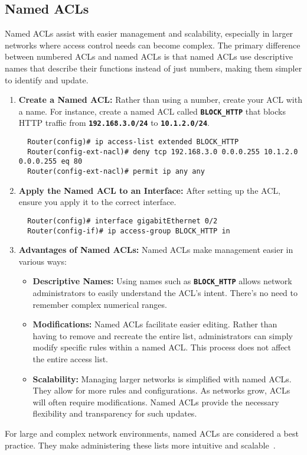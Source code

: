 \documentclass[11pt,a4paper]{article}
\begin{document}
    \subsection*{Named ACLs}
    Named ACLs assist with easier management and scalability, especially in larger networks where access control needs can become complex. The primary difference between numbered ACLs and named ACLs is that named ACLs use descriptive names that describe their functions instead of just numbers, making them simpler to identify and update.
        \begin{enumerate}
            \item \textbf{Create a Named ACL:} Rather than using a number, create your ACL with a name. For instance, create a named ACL called \textbf{\lstinline{BLOCK_HTTP}} that blocks HTTP traffic from \textbf{\lstinline{192.168.3.0/24}} to \textbf{\lstinline{10.1.2.0/24}}.
\begin{lstlisting}
  Router(config)# ip access-list extended BLOCK_HTTP
  Router(config-ext-nacl)# deny tcp 192.168.3.0 0.0.0.255 10.1.2.0 0.0.0.255 eq 80
  Router(config-ext-nacl)# permit ip any any
\end{lstlisting}
            \item \textbf{Apply the Named ACL to an Interface:} After setting up the ACL, ensure you apply it to the correct interface.
\begin{lstlisting}
  Router(config)# interface gigabitEthernet 0/2
  Router(config-if)# ip access-group BLOCK_HTTP in                
\end{lstlisting}
            
            \item \textbf{Advantages of Named ACLs:} Named ACLs make management easier in various ways:
                \begin{itemize}
                    \item \textbf{Descriptive Names:} Using names such as \textbf{\lstinline{BLOCK_HTTP}}  allows network administrators to easily understand the ACL's intent. There’s no need to remember complex numerical ranges.

                    \item \textbf{Modifications:} Named ACLs facilitate easier editing. Rather than having to remove and recreate the entire list, administrators can simply modify specific rules within a named ACL. This process does not affect the entire access list.

                    \item \textbf{Scalability:} Managing larger networks is simplified with named ACLs. They allow for more rules and configurations. As networks grow, ACLs will often require modifications. Named ACLs provide the necessary flexibility and transparency for such updates.
                \end{itemize}

        \end{enumerate}
        For large and complex network environments, named ACLs are considered a best practice. They make administering these lists more intuitive and scalable~\cite{Configuring-Named-ACLs}.
\end{document}
